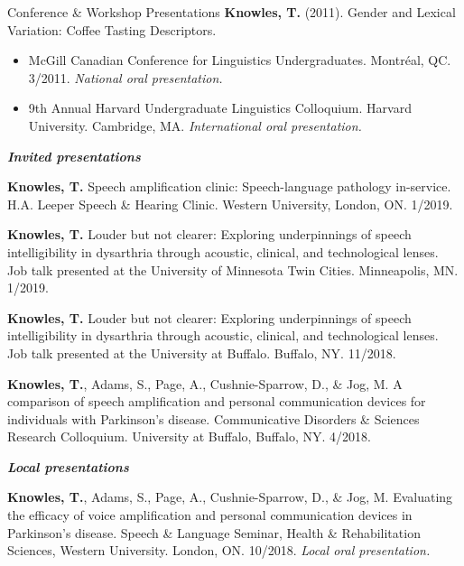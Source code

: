 \documentclass{resume} %
\begin{document}
\begin{rSection}{Conference \& Workshop Presentations}
	{\bf Knowles, T.} (2011). Gender and Lexical Variation: Coffee Tasting Descriptors. 
	\begin{itemize}
				\renewcommand\labelitemi{$\cdot$}
		\item McGill Canadian Conference for Linguistics Undergraduates. Montr\'eal, QC. 3/2011. \emph{National oral presentation.}
		\item 9th Annual Harvard Undergraduate Linguistics Colloquium. Harvard University. Cambridge, MA. \emph{International oral presentation.}
	\end{itemize}



\begin{center}
	{\bf \emph{Invited presentations}}
\end{center}


{\bf Knowles, T.} Speech amplification clinic: Speech-language pathology in-service. H.A. Leeper Speech \& Hearing Clinic. Western University, London, ON. 1/2019.

{\bf Knowles, T.} Louder but not clearer: Exploring underpinnings of speech intelligibility in dysarthria through acoustic, clinical, and technological lenses. Job talk presented at the University of Minnesota Twin Cities. Minneapolis, MN. 1/2019.

{\bf Knowles, T.} Louder but not clearer: Exploring underpinnings of speech intelligibility in dysarthria through acoustic, clinical, and technological lenses. Job talk presented at the University at Buffalo. Buffalo, NY. 11/2018.

{\bf Knowles, T.}, Adams, S., Page, A., Cushnie-Sparrow, D., \& Jog, M. A comparison of speech amplification and personal communication devices for individuals with Parkinson's disease. Communicative Disorders \& Sciences Research Colloquium. University at Buffalo, Buffalo, NY. 4/2018.



\begin{center}
	{\bf \emph{Local presentations}}
\end{center}

	{\bf Knowles, T.}, Adams, S., Page, A., Cushnie-Sparrow, D., \& Jog, M. Evaluating the efficacy of voice amplification and personal communication devices in Parkinson's disease. Speech \& Language Seminar, Health \& Rehabilitation Sciences, Western University. London, ON. 10/2018. \emph{Local oral presentation.}


\end{rSection}
\end{document}
